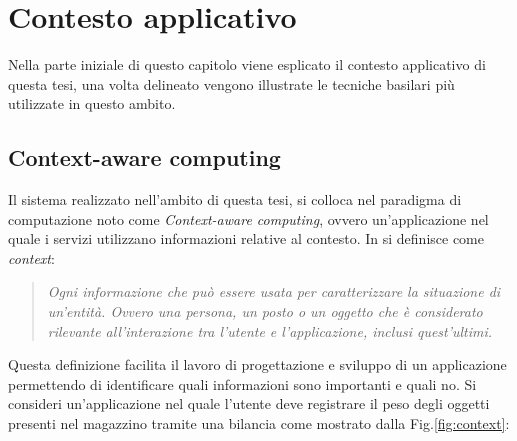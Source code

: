 \chapter{Contesto applicativo }
\label{contesto}
Nella parte iniziale di questo capitolo viene esplicato il contesto applicativo di questa tesi, una volta delineato vengono illustrate le tecniche basilari più utilizzate in questo ambito.

\section{Context-aware computing}
\label{context-aware}
Il sistema realizzato nell'ambito di questa tesi, si colloca nel paradigma di computazione noto come \textit{Context-aware computing}, ovvero un'applicazione nel quale i servizi utilizzano informazioni relative al contesto. In \cite{context} si definisce come \textit{context}:

\begin{quotation}
\textit{Ogni informazione che può essere usata per caratterizzare la situazione di un'entità. Ovvero una persona, un posto o un oggetto che è considerato rilevante all'interazione tra l'utente e l'applicazione, inclusi quest'ultimi.}
\end{quotation}

Questa definizione facilita il lavoro di progettazione e sviluppo di un applicazione permettendo di identificare quali informazioni sono importanti e quali no.
Si consideri un'applicazione nel quale l'utente deve registrare il peso degli oggetti presenti nel magazzino tramite una bilancia come mostrato dalla Fig.\ref{fig:context}:

